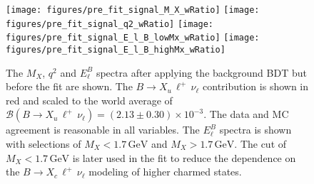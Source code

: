 \documentclass[twocolumn,aps,prd,superscriptaddress,nofootinbib,floatfix,preprintnumbers,a4]{revtex4-1}
\newcommand{\bulnu}{\ensuremath{B \to X_u \, \ell^+\, \nu_{\ell}}\xspace}
\newcommand{\bclnu}{\ensuremath{B \to X_c \, \ell^+\, \nu_{\ell}}\xspace}
\begin{document}
\begin{figure}
  \texttt{[image: figures/pre\_fit\_signal\_M\_X\_wRatio]} 
  \texttt{[image: figures/pre\_fit\_signal\_q2\_wRatio]} 
  \texttt{[image: figures/pre\_fit\_signal\_E\_l\_B\_lowMx\_wRatio]} 
  \texttt{[image: figures/pre\_fit\_signal\_E\_l\_B\_highMx\_wRatio]} 
\caption{
 The $M_X$, $q^2$ and $E_\ell^B$ spectra after applying the background BDT but before the fit are shown. The \bulnu contribution is shown in red and scaled to the world average of $\mathcal{B}(\bulnu) = \left(  2.13 \pm 0.30 \right) \times 10^{-3}$. The data and MC agreement is reasonable in all variables. The $E_\ell^B$ spectra is shown with selections of $M_X < 1.7 \, \text{GeV}$ and  $M_X > 1.7 \, \text{GeV}$. The cut of  $M_X < 1.7 \, \text{GeV}$ is later used in the fit to reduce the dependence on the \bclnu modeling of higher charmed states. 
 }
\label{fig:ulnu_shapes}
\end{figure}

\twocolumngrid

\onecolumngrid
\end{document}
